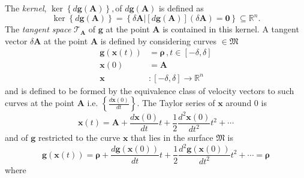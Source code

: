 \documentclass[aps,preprint]{revtex4}%
\begin{document}
The \emph{kernel}, $\ker\left\{  d\boldsymbol{g}\left(  \boldsymbol{A}\right)
\right\}  ,$of $d\boldsymbol{g}\left(  \boldsymbol{A}\right)  $ is defined as%
\begin{equation}
\ker\left\{  d\boldsymbol{g}\left(  \boldsymbol{A}\right)  \right\}  =\left\{
\left.  \delta\boldsymbol{A}\right\vert \left[  d\boldsymbol{g}\left(
\boldsymbol{A}\right)  \right]  \left(  \delta\boldsymbol{A}\right)
=\boldsymbol{0}\right\}  \subseteq\mathbb{R}^{n}.
\end{equation}
The \emph{tangent space} $\mathcal{T}_{\boldsymbol{A}}$ of $\boldsymbol{g}$ at
the point $\boldsymbol{A}$ is contained in this kernel. A tangent vector
$\delta\boldsymbol{A}$ at the point $\boldsymbol{A}$ is defined by considering
curves $\in\mathfrak{M}$%
\begin{align}
\boldsymbol{g}\left(  \boldsymbol{x}\left(  t\right)  \right)   &
=\mathbf{\rho}\,,t\in\left[  -\delta,\delta\right] \nonumber\\
\boldsymbol{x}\left(  0\right)   &  =\boldsymbol{A}\nonumber\\
\boldsymbol{x}  &  :\left[  -\delta,\delta\right]  \longrightarrow
\mathbb{R}^{n}%
\end{align}
and is defined to be formed by the equivalence class of velocity vectors to
such curves at the point $\boldsymbol{A}$ i.e. $\left\{  \frac{d\boldsymbol{x}%
\left(  0\right)  }{dt}\right\}  .$ The Taylor series of $\boldsymbol{x}$
around $0$ is
\begin{equation}
\boldsymbol{x}\left(  t\right)  =\boldsymbol{A}+\frac{d\boldsymbol{x}\left(
0\right)  }{dt}t+\frac{1}{2}\frac{d^{2}\boldsymbol{x}\left(  0\right)
}{dt^{2}}t^{2}+\cdots
\end{equation}
and of $\boldsymbol{g}$ restricted to the curve $\boldsymbol{x}$ that lies in
the surface $\mathfrak{M}$ is
\begin{equation}
\boldsymbol{g}\left(  \boldsymbol{x}\left(  t\right)  \right)
=\boldsymbol{\rho}+\frac{d\boldsymbol{g}\left(  \boldsymbol{x}\left(
0\right)  \right)  }{dt}t+\frac{1}{2}\frac{d^{2}\boldsymbol{g}\left(
\boldsymbol{x}\left(  0\right)  \right)  }{dt^{2}}t^{2}+\cdots
=\boldsymbol{\rho}%
\end{equation}
where%
\end{document}

